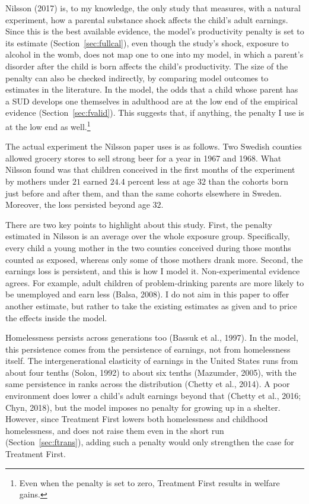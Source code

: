 \documentclass[10pt]{article}
\begin{document}
Nilsson (2017) is, to my knowledge, the only study that measures, with a natural experiment, how a parental substance shock affects the child's adult earnings. Since this is the best available evidence, the model's productivity penalty is set to its estimate (Section~\ref{sec:fullcal}), even though the study's shock, exposure to alcohol in the womb, does not map one to one into my model, in which a parent's disorder after the child is born affects the child's productivity.   The size of the penalty can also be checked indirectly, by comparing model outcomes to estimates in the literature. In the model, the odds that a child whose parent has a SUD develops one themselves in adulthood are at the low end of the empirical evidence (Section~\ref{sec:fvalid}). This suggests that, if anything, the penalty I use is at the low end as well.\footnote{ Even when the penalty is set to zero, Treatment First results in welfare gains.}

  The actual experiment the Nilsson paper uses is as follows. Two Swedish counties allowed grocery stores to sell strong beer for a year in 1967 and 1968. What Nilsson found was that children conceived in the first months of the experiment by mothers under $21$ earned $24.4$ percent less at age $32$ than the cohorts born just before and after them, and than the same cohorts elsewhere in Sweden. Moreover, the loss persisted beyond age $32$.

 There are two key points to highlight about this study. First, the penalty estimated in Nilsson is an average over the whole exposure group. Specifically, every child a young mother in the two counties conceived during those months counted as exposed, whereas only some of those mothers drank more. Second, the earnings loss is persistent, and this is how I model it. Non-experimental evidence agrees. For example, adult children of problem-drinking parents are more likely to be unemployed and earn less (Balsa, 2008). I do not aim in this paper to offer another estimate, but rather to take the existing estimates as given and to price the effects inside the model.

Homelessness persists across generations too (Bassuk et al., 1997). In the model, this persistence comes from the persistence of earnings, not from homelessness itself. The intergenerational elasticity of earnings in the United States runs from about four tenths (Solon, 1992) to about six tenths (Mazumder, 2005), with the same persistence in ranks across the distribution (Chetty et al., 2014). A poor environment does lower a child's adult earnings beyond that (Chetty et al., 2016; Chyn, 2018), but the model imposes no penalty for growing up in a shelter. However, since Treatment First lowers both homelessness and childhood homelessness, and does not raise them even in the short run (Section~\ref{sec:ftrans}), adding such a penalty would only strengthen the case for Treatment First.
\end{document}

